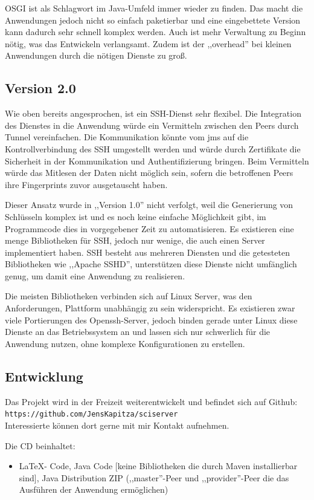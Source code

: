 \documentclass[oneside, ngerman, toc=bibliography,bibliography=totoc,listof=entryprefix, open=right,numbers=noenddot,fontsize=12pt]{scrbook}
\begin{document}
OSGI ist als Schlagwort im Java-Umfeld immer wieder zu finden. Das macht die Anwendungen jedoch nicht so einfach paketierbar und eine eingebettete Version kann dadurch sehr schnell komplex werden. Auch ist mehr Verwaltung zu Beginn nötig, was das Entwickeln verlangsamt. Zudem ist der ,,overhead'' bei kleinen Anwendungen durch die nötigen Dienste zu groß.

\subsection{Version 2.0}
Wie oben bereits angesprochen, ist ein SSH-Dienst sehr flexibel. Die Integration des Dienstes in die Anwendung würde ein Vermitteln zwischen den Peers durch Tunnel vereinfachen. Die Kommunikation könnte vom \acrshort{jms} auf die Kontrollverbindung des SSH umgestellt werden und würde durch Zertifikate die Sicherheit in der Kommunikation und Authentifizierung bringen. Beim Vermitteln würde das Mitlesen der Daten nicht möglich sein, sofern die betroffenen Peers ihre Fingerprints zuvor ausgetauscht haben.

Dieser Ansatz wurde in ,,Version 1.0'' nicht verfolgt, weil die Generierung von Schlüsseln komplex ist und es noch keine einfache Möglichkeit gibt, im Programmcode dies in vorgegebener Zeit zu automatisieren.
Es existieren eine menge Bibliotheken für SSH, jedoch nur wenige, die auch einen Server implementiert haben.
SSH besteht aus mehreren Diensten und die getesteten Bibliotheken wie ,,Apache SSHD'', unterstützen diese Dienste nicht umfänglich genug, um damit eine Anwendung zu realisieren.

Die meisten Bibliotheken verbinden sich auf Linux Server, was den Anforderungen, Plattform unabhängig zu sein widerspricht. Es existieren zwar viele Portierungen des Openssh-Server, jedoch binden gerade unter Linux diese Dienste an das Betriebssystem an und lassen sich nur schwerlich für die Anwendung nutzen, ohne komplexe Konfigurationen zu erstellen.

\subsection{Entwicklung}
Das Projekt wird in der Freizeit weiterentwickelt und befindet sich auf Github:\\
 \verb|https://github.com/JensKapitza/sciserver| \\ 
Interessierte können dort gerne mit mir Kontakt aufnehmen.

Die CD beinhaltet:
\begin{itemize}
    \item \LaTeX - Code, Java Code [keine Bibliotheken die durch Maven installierbar sind], Java Distribution ZIP (,,master''-Peer und ,,provider''-Peer die das Ausführen der Anwendung ermöglichen)
\end{itemize}
\end{document}
